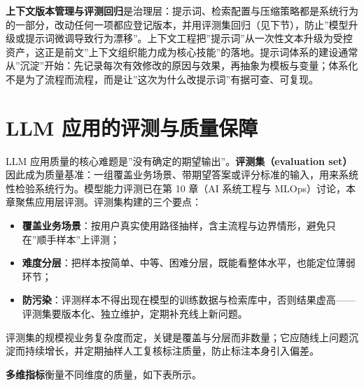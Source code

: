 \documentclass[12pt,a4paper,twoside,openany]{ctexbook}
\numberwithin{figure}{chapter}
\numberwithin{table}{chapter}
\providecommand{\tightlist}{\setlength{\itemsep}{0pt}\setlength{\parskip}{0pt}}
\begin{document}
\textbf{上下文版本管理与评测回归}是治理层：提示词、检索配置与压缩策略都是系统行为的一部分，改动任何一项都应登记版本，并用评测集回归（见下节），防止''模型升级或提示词微调导致行为漂移''。上下文工程把''提示词''从一次性文本升级为受控资产，这正是前文''上下文组织能力成为核心技能''的落地。提示词体系的建设通常从''沉淀''开始：先记录每次有效修改的原因与效果，再抽象为模板与变量；体系化不是为了流程而流程，而是让''这次为什么改提示词''有据可查、可复现。

\section{LLM
应用的评测与质量保障}\label{llm-ux5e94ux7528ux7684ux8bc4ux6d4bux4e0eux8d28ux91cfux4fddux969c}

LLM
应用质量的核心难题是''没有确定的期望输出''。\textbf{评测集（evaluation
set）}因此成为质量基准：一组覆盖业务场景、带期望答案或评分标准的输入，用来系统性检验系统行为。模型能力评测已在第
10 章（AI 系统工程与
MLOps）讨论，本章聚焦应用层评测。评测集构建的三个要点：

\begin{itemize}
\tightlist
\item
  \textbf{覆盖业务场景}：按用户真实使用路径抽样，含主流程与边界情形，避免只在''顺手样本''上评测；
\item
  \textbf{难度分层}：把样本按简单、中等、困难分层，既能看整体水平，也能定位薄弱环节；
\item
  \textbf{防污染}：评测样本不得出现在模型的训练数据与检索库中，否则结果虚高------评测集要版本化、独立维护，定期补充线上新问题。
\end{itemize}

评测集的规模视业务复杂度而定，关键是覆盖与分层而非数量；它应随线上问题沉淀而持续增长，并定期抽样人工复核标注质量，防止标注本身引入偏差。

\textbf{多维指标}衡量不同维度的质量，如下表所示。
\end{document}
